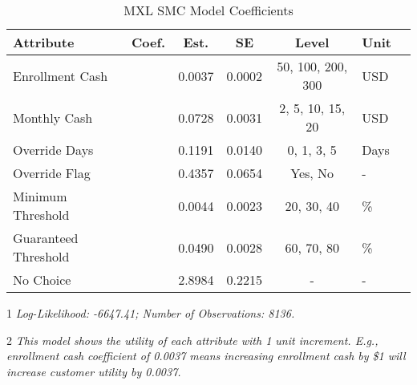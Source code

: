 \begin{table}[H]
\centering
\begin{threeparttable}
\caption{MXL SMC Model Coefficients}
\fontsize{11}{12}\selectfont
\begin{tabular}{l>{\centering\arraybackslash}p{1.5cm}ccc>{\centering\arraybackslash}p{2cm}c}
\toprule
\textbf{Attribute} & \textbf{Coef.} & \textbf{Est.} & \textbf{SE} & \textbf{Level} & \textbf{Unit}\\
\midrule
\multirow{-1}{*}{\raggedright\arraybackslash Enrollment Cash} & \multirow{-1}{1.5cm}{\centering\arraybackslash $\beta_1$} & 0.0037 & 0.0002 & 50, 100, 200, 300 & USD\\
\cmidrule(lr){1-6}
\multirow{-1}{*}{\raggedright\arraybackslash Monthly Cash} & \multirow{-1}{1.5cm}{\centering\arraybackslash $\beta_2$} & 0.0728 & 0.0031 & 2, 5, 10, 15, 20 & USD\\
\cmidrule(lr){1-6}
\multirow{-1}{*}{\raggedright\arraybackslash Override Days} & \multirow{-1}{1.5cm}{\centering\arraybackslash $\beta_3$} & 0.1191 & 0.0140 & 0, 1, 3, 5 & Days\\
\cmidrule(lr){1-6}
\multirow{-1}{*}{\raggedright\arraybackslash Override Flag} & \multirow{-1}{1.5cm}{\centering\arraybackslash $\beta_4$} & 0.4357 & 0.0654 & Yes, No & -\\
\cmidrule(lr){1-6}
\multirow{-1}{*}{\raggedright\arraybackslash Minimum Threshold} & \multirow{-1}{1.5cm}{\centering\arraybackslash $\beta_5$} & 0.0044 & 0.0023 & 20, 30, 40 & \%\\
\cmidrule(lr){1-6}
\multirow{-1}{*}{\raggedright\arraybackslash Guaranteed Threshold} & \multirow{-1}{1.5cm}{\centering\arraybackslash $\beta_6$} & 0.0490 & 0.0028 & 60, 70, 80 & \%\\
\cmidrule(lr){1-6}
\multirow{-1}{*}{\raggedright\arraybackslash No Choice} & \multirow{-1}{1.5cm}{\centering\arraybackslash $\beta_7$} & 2.8984 & 0.2215 & - & -\\
\bottomrule
\end{tabular}
\begin{tablenotes}
\small
\item [1] \textit{Log-Likelihood: -6647.41; Number of Observations: 8136.}
\item [2] \textit{This model shows the utility of each attribute with 1 unit increment. E.g., enrollment cash coefficient of 0.0037 means increasing enrollment cash by \$1 will increase customer utility by 0.0037.}
\end{tablenotes}
\label{table_mxl_model_smc}
\end{threeparttable}
\end{table}

